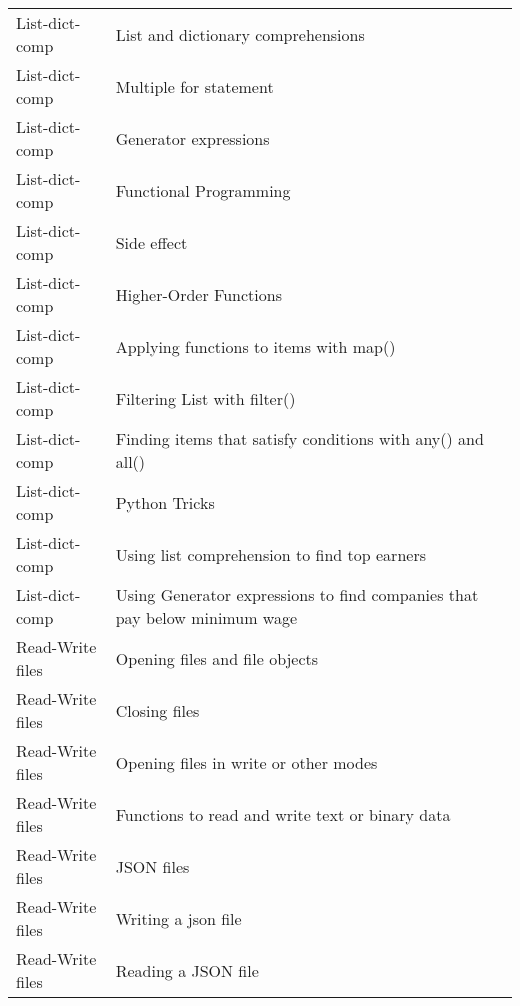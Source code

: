 \documentclass[10pt,a4paper]{article}
\begin{document}
\begin{landscape}
\begin{longtable}{|l|l|l|}
List-dict-comp & List and dictionary comprehensions & \cite{ceder2018quick} \\
    List-dict-comp & Multiple for statement & \cite{danjou2018serious} \\
    List-dict-comp & Generator expressions & \cite{ceder2018quick} \\
    List-dict-comp & Functional Programming & \cite{sweigart2020beyond} \\
    List-dict-comp & Side effect & \cite{sweigart2020beyond} \\
    List-dict-comp & Higher-Order Functions & \cite{sweigart2020beyond} \\
    List-dict-comp & Applying functions to items with map() & \cite{danjou2018serious} \\
    List-dict-comp & Filtering List with filter() & \cite{danjou2018serious} \\
    List-dict-comp & Finding items that satisfy conditions with any() and all() & \cite{danjou2018serious} \\
    List-dict-comp & Python Tricks & \cite{mayer2020oneliners} \\
    List-dict-comp & Using list comprehension to find top earners & \cite{mayer2020oneliners} \\
    List-dict-comp & Using Generator expressions to find companies that pay below minimum wage & \cite{mayer2020oneliners} \\
    
Read-Write files & Opening files and file objects & \cite{ceder2018quick} \\
    Read-Write files & Closing files & \cite{ceder2018quick} \\
    Read-Write files & Opening files in write or other modes & \cite{ceder2018quick} \\
    Read-Write files & Functions to read and write text or binary data & \cite{ceder2018quick} \\
    Read-Write files & JSON files & \cite{kong2020python} \\
    Read-Write files & Writing a json file & \cite{kong2020python} \\
    Read-Write files & Reading a JSON file & \cite{kong2020python} \\
    

\end{longtable}
\end{landscape}
\end{document}
